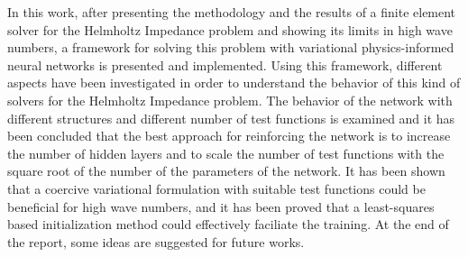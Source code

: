 In this work, after presenting the methodology and the results of a finite element solver for the Helmholtz Impedance problem and showing its limits in high wave numbers, a framework for solving this problem with variational physics-informed neural networks is presented and implemented. Using this framework, different aspects have been investigated in order to understand the behavior of this kind of solvers for the Helmholtz Impedance problem. The behavior of the network with different structures and different number of test functions is examined and it has been concluded that the best approach for reinforcing the network is to increase the number of hidden layers and to scale the number of test functions with the square root of the number of the parameters of the network. It has been shown that a coercive variational formulation with suitable test functions could be beneficial for high wave numbers, and it has been proved that a least-squares based initialization method could effectively faciliate the training. At the end of the report, some ideas are suggested for future works.
